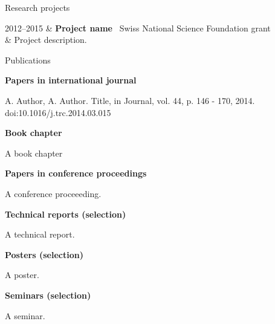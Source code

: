 \documentclass[twoside, a4paper, 11pt]{cv}
\newcommand{\lieu}[1]{{#1}\ }
\newcommand{\activite}[1]{\textbf{#1}\ }
\begin{document}
\begin{rubriquetableau}[3cm]{Research projects} 

2012--2015 	& \activite{Project name}
	\lieu{Swiss National Science Foundation grant}\\
	& Project description.\\

\end{rubriquetableau}

\begin{rubrique}{Publications}

\noindent\activite{Papers in international journal}

A. Author, A. Author. Title, in Journal, vol. 44, p. 146 - 170, 2014. doi:10.1016/j.trc.2014.03.015\vspace{0.2cm}

\noindent\activite{Book chapter}

A book chapter\vspace{0.2cm}

\noindent\activite{Papers in conference proceedings}

A conference proceeeding.\vspace{0.2cm}

\noindent\activite{Technical reports (selection)}

A technical report.\vspace{0.2cm}

\noindent\activite{Posters (selection)}

A poster.\vspace{0.2cm}

\noindent\activite{Seminars (selection)}

A seminar.\vspace{0.2cm}

\end{rubrique}
\end{document}
